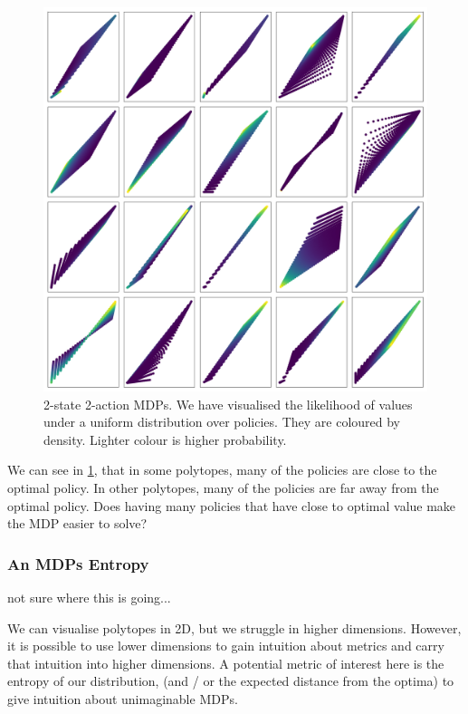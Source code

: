 \begin{figure}
\centering
\includegraphics[width=1\textwidth,height=1\textheight]{../../pictures/figures/polytope_densities.png}
\caption{2-state 2-action MDPs. We have visualised the likelihood of
values under a uniform distribution over policies. They are coloured by density.
Lighter colour is higher probability.}
\label{fig:density}
\end{figure}

We can see in \ref{fig:density}, that in some polytopes, many of the policies are close
to the optimal policy. In other polytopes, many of the policies are far
away from the optimal policy. Does having many policies that have close to
optimal value make the MDP easier to solve?

\subsubsection{An MDPs Entropy}

{\color{red}not sure where this is going...}

We can visualise polytopes in 2D, but we struggle in higher dimensions.
However, it is possible to use lower dimensions to gain intuition about
metrics and carry that intuition into higher dimensions. A potential
metric of interest here is the entropy of our distribution, (and / or
the expected distance from the optima) to give intuition about
unimaginable MDPs.

